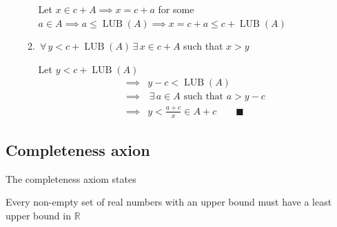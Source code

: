 \documentclass{article}
\newcommand{\bb}[1]{\mathbb{#1}}
\newcommand{\A}{\,\forall\,}
\newcommand{\E}{\,\exists\,}
\newcommand{\LUB}{\operatorname{LUB}}
\begin{document}
\begin{enumerate}
\begin{enumerate}
Let \(x\in c+A\implies x=c+a\) for some \(a\in A\implies a\le\LUB(A)\implies x=c+a\le c+\LUB(A)\)

\item \(\A y< c+\LUB(A)\E x\in c+A\) such that \(x>y\)

Let \(y<c+\LUB(A)\)
\begin{align*}
\implies &y-c<\LUB(A)\\
\implies &\E a\in A\text{ such that }a>y-c\\
\implies &y<\frac{a+c}{x}\in A+c\qquad\blacksquare
\end{align*}
\end{enumerate}
\end{enumerate}

\subsection*{Completeness axion}
The completeness axiom states
\begin{displayquote}
Every non-empty set of real numbers with an upper bound must have a least upper bound in \(\bb R\)
\end{displayquote}
\end{document}

